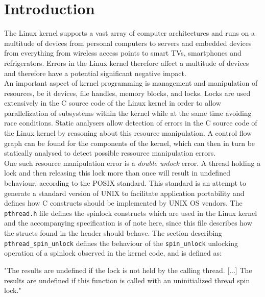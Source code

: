 \section{Introduction}

\noindent The Linux kernel supports a vast array of computer architectures and runs on a multitude of devices from personal computers to servers and embedded devices from everything from wireless access points to smart TVs, smartphones and refrigerators.
Errors in the Linux kernel therefore affect a multitude of devices and therefore have a potential significant negative impact. \\

\noindent An important aspect of kernel programming is management and manipulation of resources, be it devices, file handles, memory blocks, and locks. Locks are used extensively in the C source code of the Linux kernel in order to allow parallelization of subsystems within the kernel while at the same time avoiding race conditions. Static analysers allow detection of errors in the C source code of the Linux kernel by reasoning about this resource manipulation. A control flow graph can be found for the components of the kernel, which can then in turn be statically analysed to detect possible ressource manipulation errors. \\

\noindent One such resource manipulation error is a \textit{double unlock} error. A thread holding a lock and then releasing this lock more than once will result in undefined behaviour, according to the POSIX standard. This standard is an attempt to generate a standard version of UNIX to facilitate application portability and defines how C constructs should be implemented by UNIX OS vendors. The \texttt{pthread.h} file defines the spinlock constructs which are used in the Linux kernel and the accompanying specification is of note here, since this file describes how the structs found in the header should behave. The section describing \texttt{pthread\_spin\_unlock} defines the behaviour of the \texttt{spin\_unlock} unlocking operation of a spinlock observed in the kernel code, and is defined as:

\begin{center}
"The results are undefined if the lock is not held by the calling thread.
[...] 
The results are undefined if this function is called with an uninitialized thread spin lock." \cite{unlockPOSIX} \\
\end{center}

